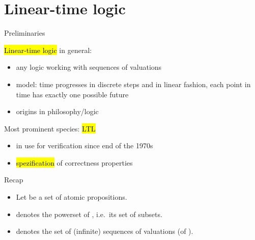 
\section{Linear-time logic}


\begin{frame}{Preliminaries}

\hl{Linear-time logic} in general:
\begin{itemize}
\item any logic working with sequences of valuations
\item model: time progresses in discrete steps and in linear fashion, each point in time has exactly one possible future
\item origins in philosophy/logic
\end{itemize}

\bigskip
Most prominent species: \hl{LTL}
\begin{itemize}
\item in use for verification since end of the 1970s
\item \hl{spezification} of correctness properties
\end{itemize}
\end{frame}


\begin{frame}{Recap}
\begin{itemize}
\itemsep1em
\item Let  be a set of atomic propositions.

\item {} denotes the powerset of ,
   i.e.\ its set of subsets.

\item {} denotes the set of
  (infinite) sequences of valuations (of ).\\[20mm]
\end{itemize}
\end{frame}


